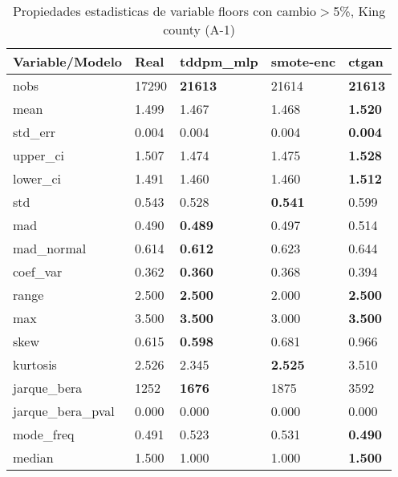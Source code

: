 \begin{table}[H]
\centering
\fontsize{8}{14}\selectfont
\caption{Propiedades estadisticas de variable floors con cambio\ensuremath{>}5\%, King county (A-1)}
\label{table-stats-king county-a-1-floors-short}
\begin{tabular}{|l|m{10em}|m{10em}|m{10em}|m{10em}|}
\hline
 \rowcolor[gray]{0.8}
Variable/Modelo & Real & tddpm\_mlp & smote-enc & ctgan \\
\hline nobs & 17290 & \bfseries 21613 & \cellcolor[rgb]{0.9, 0.54, 0.52} 21614 & \bfseries 21613 \\
\hline mean & 1.499 & \cellcolor[rgb]{0.9, 0.54, 0.52} 1.467 & 1.468 & \bfseries 1.520 \\
\hline std\_err & 0.004 & \cellcolor[rgb]{0.9, 0.54, 0.52} 0.004 & 0.004 & \bfseries 0.004 \\
\hline upper\_ci & 1.507 & \cellcolor[rgb]{0.9, 0.54, 0.52} 1.474 & 1.475 & \bfseries 1.528 \\
\hline lower\_ci & 1.491 & \cellcolor[rgb]{0.9, 0.54, 0.52} 1.460 & 1.460 & \bfseries 1.512 \\
\hline std & 0.543 & 0.528 & \bfseries 0.541 & \cellcolor[rgb]{0.9, 0.54, 0.52} 0.599 \\
\hline mad & 0.490 & \bfseries 0.489 & 0.497 & \cellcolor[rgb]{0.9, 0.54, 0.52} 0.514 \\
\hline mad\_normal & 0.614 & \bfseries 0.612 & 0.623 & \cellcolor[rgb]{0.9, 0.54, 0.52} 0.644 \\
\hline coef\_var & 0.362 & \bfseries 0.360 & 0.368 & \cellcolor[rgb]{0.9, 0.54, 0.52} 0.394 \\
\hline range & 2.500 & \bfseries 2.500 & \cellcolor[rgb]{0.9, 0.54, 0.52} 2.000 & \bfseries 2.500 \\
\hline max & 3.500 & \bfseries 3.500 & \cellcolor[rgb]{0.9, 0.54, 0.52} 3.000 & \bfseries 3.500 \\
\hline skew & 0.615 & \bfseries 0.598 & 0.681 & \cellcolor[rgb]{0.9, 0.54, 0.52} 0.966 \\
\hline kurtosis & 2.526 & 2.345 & \bfseries 2.525 & \cellcolor[rgb]{0.9, 0.54, 0.52} 3.510 \\
\hline jarque\_bera & 1252 & \bfseries 1676 & 1875 & \cellcolor[rgb]{0.9, 0.54, 0.52} 3592 \\
\hline jarque\_bera\_pval & 0.000 & 0.000 & 0.000 & 0.000 \\
\hline mode\_freq & 0.491 & 0.523 & \cellcolor[rgb]{0.9, 0.54, 0.52} 0.531 & \bfseries 0.490 \\
\hline median & 1.500 & \cellcolor[rgb]{0.9, 0.54, 0.52} 1.000 & \cellcolor[rgb]{0.9, 0.54, 0.52} 1.000 & \bfseries 1.500 \\
\hline
\end{tabular}
\end{table}
